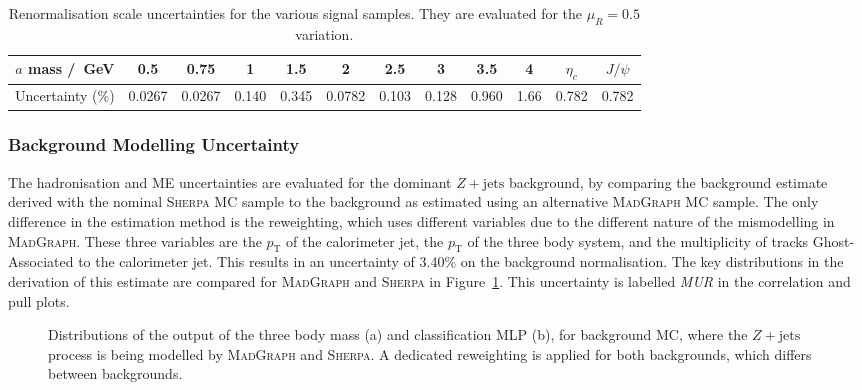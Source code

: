 \documentclass[NOTE, atlasdraft=true, texlive=2017, UKenglish]{\ATLASLATEXPATH atlasdoc}
\begin{document}
\begin{table}[!htbp]{\footnotesize\renewcommand{\arraystretch}{1.2}
  \begin{center}
    \footnotesize
    \begin{tabular}{|c|ccccccccc|cc|}
      \hline
      $a$ mass /~GeV & 0.5 & 0.75 & 1 & 1.5 & 2 & 2.5 & 3 & 3.5 & 4 & $\eta_c$ & $J/\psi$ \\
      \hline
      Uncertainty (\%) & 0.0267 & 0.0267 & 0.140 & 0.345 & 0.0782 & 0.103 & 0.128 & 0.960 & 1.66 & 0.782 & 0.782 \\
      \hline
    \end{tabular}
    \caption{Renormalisation scale uncertainties for the various signal samples. They are evaluated for the $\mu_R=0.5$ variation.}
    \label{tab:mursys}
  \end{center}}
\end{table}


\subsubsection{Background Modelling Uncertainty}
\label{sec:sysbkgddecaymodel}

The hadronisation and ME uncertainties are evaluated for the dominant $Z+\text{jets}$ background, by comparing the background estimate derived with the nominal \textsc{Sherpa} MC sample to the background as estimated using an alternative \textsc{MadGraph} MC sample. The only difference in the estimation method is the reweighting, which uses different variables due to the different nature of the mismodelling in \textsc{MadGraph}. These three variables are the $p_\text{T}$ of the calorimeter jet, the $p_\text{T}$ of the three body system, and the multiplicity of tracks Ghost-Associated to the calorimeter jet. This results in an uncertainty of 3.40\% on the background normalisation. The key distributions in the derivation of this estimate are compared for \textsc{MadGraph} and \textsc{Sherpa} in Figure~\ref{fig:mgvssherpa}. This uncertainty is labelled \emph{MUR} in the correlation and pull plots. %

\begin{figure}[!htbp]
  \centering
  \caption{Distributions of the output of the three body mass (a) and classification MLP (b), for background MC, where the $Z+\text{jets}$ process is being modelled by \textsc{MadGraph} and \textsc{Sherpa}. A dedicated reweighting is applied for both backgrounds, which differs between backgrounds.}
  \label{fig:mgvssherpa}
\end{figure}
\end{document}

